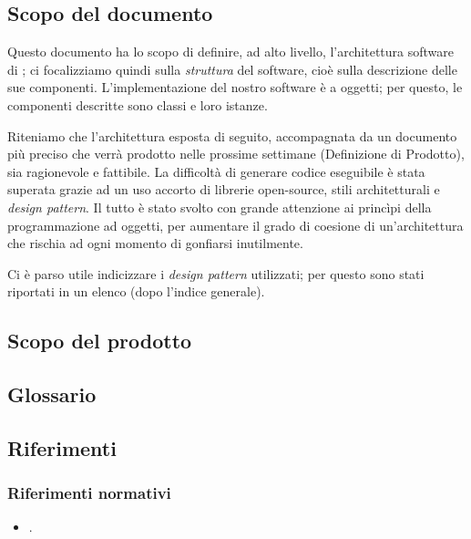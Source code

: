 
\subsection{Scopo del documento}
Questo documento ha lo scopo di definire, ad alto livello, l'architettura software di \proj; ci focalizziamo quindi sulla \emph{struttura} del software, cioè sulla descrizione delle sue componenti. L'implementazione del nostro software è a oggetti; per questo, le componenti descritte sono classi e loro istanze.

Riteniamo che l'architettura esposta di seguito, accompagnata da un documento più preciso che verrà prodotto nelle prossime settimane (Definizione di Prodotto), sia ragionevole e fattibile. La difficoltà di generare codice eseguibile è stata superata grazie ad un uso accorto di librerie open-source, stili architetturali e \emph{design pattern}. Il tutto è stato svolto con grande attenzione ai princìpi della programmazione ad oggetti, per aumentare il grado di coesione di un'architettura che rischia ad ogni momento di gonfiarsi inutilmente.

Ci è parso utile indicizzare i \emph{design pattern} utilizzati; per questo sono stati riportati in un elenco (dopo l'indice generale).

\subsection{Scopo del prodotto}
\scopo

\subsection{Glossario}
\presgloss

\subsection{Riferimenti} \label{sec:ref}

\subsubsection{Riferimenti normativi}
\begin{itemize}
	\item \NdP.
\end{itemize}

